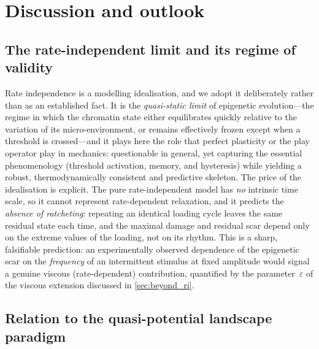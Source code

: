\section{Discussion and outlook}\label{sec:discussion}

\subsection{The rate-independent limit and its regime of validity}
\label{sec:ri_validity}

Rate independence is a modelling idealisation, and we adopt it
deliberately rather than as an established fact. It is the
\emph{quasi-static limit} of epigenetic evolution---the regime in which
the chromatin state either equilibrates quickly relative to the
variation of its micro-environment, or remains effectively frozen except
when a threshold is crossed---and it plays here the role that perfect
plasticity or the play operator play in mechanics: questionable in
general, yet capturing the essential phenomenology (threshold
activation, memory, and hysteresis) while yielding a robust,
thermodynamically consistent and predictive skeleton. The price of the
idealisation is explicit. The pure rate-independent model has \emph{no}
intrinsic time scale, so it cannot represent rate-dependent relaxation,
and it predicts the \emph{absence of ratcheting}: repeating an identical
loading cycle leaves the same residual state each time, and the maximal
damage and residual scar depend only on the extreme values of the
loading, not on its rhythm. This is a sharp, falsifiable prediction: an
experimentally observed dependence of the epigenetic scar on the
\emph{frequency} of an intermittent stimulus at fixed amplitude would
signal a genuine viscous (rate-dependent) contribution, quantified by
the parameter~$\varepsilon$ of the viscous extension discussed in
\cref{sec:beyond_ri}.

\subsection{Relation to the quasi-potential landscape paradigm}
\label{sec:quasipotential}

